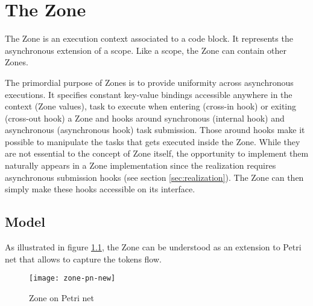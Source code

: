 \chapter{The Zone}
\label{ch:zone}

The Zone is an execution context associated to a code block. It represents the asynchronous extension of a scope. Like a scope, the Zone can contain other Zones.


The primordial purpose of Zones is to provide uniformity across asynchronous executions. It specifies constant key-value bindings accessible anywhere in the context (Zone values), task to execute when entering (cross-in hook) or exiting (cross-out hook) a Zone and hooks around synchronous (internal hook) and asynchronous (asynchronous hook) task submission. Those around hooks make it possible to manipulate the tasks that gets executed inside the Zone. While they are not essential to the concept of Zone itself, the opportunity to implement them naturally appears in a Zone implementation since the realization requires asynchronous submission hooks (see section \ref{sec:realization}). The Zone can then simply make these hooks accessible on its interface.

\section{Model}

As illustrated in figure \ref{fig:zpn}, the Zone can be understood as an extension to Petri net that allows to capture the tokens flow.

\begin{figure}
  \centering
  \texttt{[image: zone-pn-new]}
  \caption{Zone on Petri net}
  \label{fig:zpn}
\end{figure}


